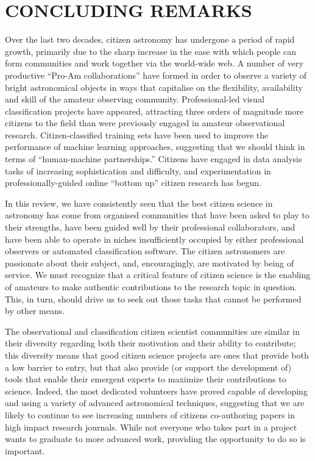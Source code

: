 \documentclass{ar2e}
\begin{document}

\section{CONCLUDING REMARKS}
\label{sec:conclusions}

Over the last two decades, citizen astronomy has undergone a period of rapid
growth, primarily due to the sharp increase in the ease with which people can
form communities and work together via the world-wide web.   A number of very
productive ``Pro-Am collaborations'' have formed in order to observe a variety
of bright astronomical objects in ways that capitalise on the flexibility,
availability and skill of the amateur observing community. Professional-led
visual classification projects have appeared, attracting three orders of
magnitude more citizens to the field than were previously engaged in amateur
observational research. Citizen-classified training sets have been used to
improve the performance of  machine learning approaches, suggesting that we
should think in terms of ``human-machine partnerships.'' Citizens have engaged
in data analysis tasks of increasing sophistication and difficulty, and
experimentation in professionally-guided online ``bottom up'' citizen research
has begun.  

In this review, we have consistently seen that the best citizen science in
astronomy has come from organised communities that have been asked to play to
their strengths, have been guided well by their professional collaborators,
and have been able to operate in niches insufficiently occupied by either
professional observers or automated classification software. The citizen
astronomers are passionate about their subject, and, encouragingly, are
motivated by being of service. We must recognize that a critical feature of
citizen science is the enabling of amateurs to make authentic contributions to
the research topic in question. This, in turn, should drive us to seek out
those tasks that cannot be performed by other means.  

The observational and classification citizen scientist communities are similar
in their diversity regarding both their motivation and their ability to
contribute;  this diversity means that good citizen science projects are ones
that provide both a low barrier to entry, but that also provide (or support
the development of) tools that enable their emergent experts to maximize their
contributions to science.  Indeed, the most dedicated volunteers have proved
capable of developing and using a variety of advanced astronomical techniques,
suggesting that we are likely to continue to see increasing numbers of
citizens co-authoring papers in high impact research journals. While not
everyone who takes part in a project wants to graduate to more advanced work,
providing the opportunity to do so is important.
\end{document}
